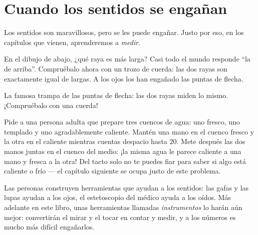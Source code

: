 \section{Cuando los sentidos se engañan}

Los sentidos son maravillosos, pero se les puede engañar. Justo por
eso, en los capítulos que vienen, aprenderemos a \emph{medir}.

\begin{example}\label{ex:g1:five-senses:lines}
En el dibujo de abajo, ¿qué raya es más larga? Casi todo el mundo
responde ``la de arriba''. Compruébalo ahora con un trozo de cuerda:
las dos rayas son exactamente igual de largas. A los ojos los han
engañado las puntas de flecha.
\end{example}

\begin{omfigure}

{\small La famosa trampa de las puntas de flecha: las dos rayas miden
lo mismo. ¡Compruébalo con una cuerda!}
\end{omfigure}

\begin{example}\label{ex:g1:five-senses:bowls}
Pide a una persona adulta que prepare tres cuencos de agua: uno
fresco, uno templado y uno agradablemente caliente. Mantén una mano
en el cuenco fresco y la otra en el caliente mientras cuentas despacio
hasta $20$. Mete después las dos manos juntas en el cuenco del medio:
¡la misma agua le parece caliente a una mano y fresca a la otra! Del
tacto solo no te puedes fiar para saber si algo está caliente o frío
--- el capítulo siguiente se ocupa justo de este problema.
\end{example}

\begin{remark}\label{rem:g1:five-senses:tools}
Las personas construyen herramientas que ayudan a los sentidos: las
gafas y las lupas ayudan a los ojos, el estetoscopio del médico ayuda
a los oídos. Más adelante en este libro, unas herramientas llamadas
\emph{instrumentos} lo harán aún mejor: convertirán el mirar y el
tocar en contar y medir, y a los números es mucho más difícil
engañarlos.
\end{remark}

